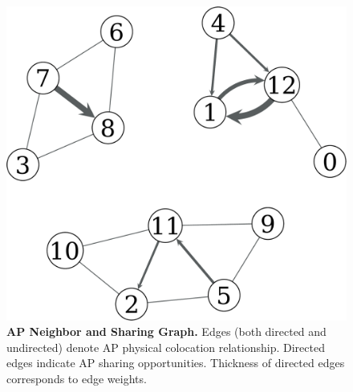 \begin{figure}[t]
  \centering
  \includegraphics[width=\columnwidth]{./figures/HomeAPNeighborFigure.pdf}
  \caption{\textbf{AP Neighbor and Sharing Graph.} Edges (both directed and
    undirected) denote AP physical
    colocation relationship. Directed edges indicate AP sharing opportunities.
  Thickness of directed edges corresponds to edge weights.}
  \label{fig:reciprocal}
\end{figure}
